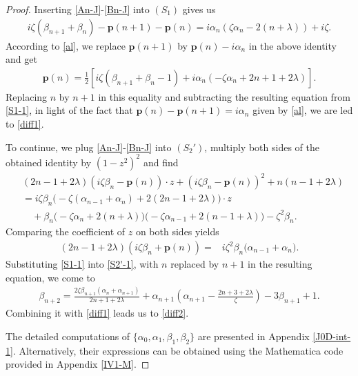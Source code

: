 \documentclass[11pt,a4paper]{article}
\numberwithin{equation}{section}
\begin{document}
\begin{proof}
Inserting \eqref{An-J}-\eqref{Bn-J} into $(S_1)$ gives us
\begin{align}\label{S1}
i\zeta\left(\beta_{n+1}+\beta_n\right)-\textbf{p}(n+1)-\textbf{p}(n)=i\alpha_n\left(\zeta\alpha_n-2(n+\lambda)\right)+i\zeta.
\end{align}
According to \eqref{al}, we replace $\textbf{p}(n+1)$ by $\textbf{p}(n)-i\alpha_n$ in the above identity and get
\begin{align}\label{S1-1}
\textbf{p}(n)=\frac{1}{2}\left[i\zeta(\beta_{n+1}+\beta_n-1)+i\alpha_n(-\zeta\alpha_n+2n+1+2\lambda)\right].
\end{align}
Replacing $n$ by $n+1$ in this equality and subtracting the resulting equation from \eqref{S1-1}, in light of the fact that $\textbf{p}(n)-\textbf{p}(n+1)=i\alpha_n$ given by \eqref{al}, we are led to \eqref{diff1}.

To continue, we plug \eqref{An-J}-\eqref{Bn-J} into $(S_2')$, multiply both sides of the obtained identity by $\left(1-z^2\right)^2$ and find
\begin{equation*}
\begin{aligned}
&(2n-1+2\lambda)\left(i\zeta\beta_n-\textbf{p}(n)\right)\cdot z+(i\zeta\beta_n-\textbf{p}(n))^2+n(n-1+2\lambda)\\
&=i\zeta\beta_n\big(-\zeta(\alpha_{n-1}+\alpha_n)+2(2n-1+2\lambda)\big)\cdot z\\
&\quad+\beta_n\big(-\zeta\alpha_n+2(n+\lambda)\big)\big(-\zeta\alpha_{n-1}+2(n-1+\lambda)\big)-\zeta^2\beta_n.
\end{aligned}
\end{equation*}
Comparing the coefficient of $z$ on both sides yields
\begin{align}
(2n-1+2\lambda)\left(i\zeta\beta_n+\textbf{p}(n)\right)=&i\zeta^2\beta_n\big(\alpha_{n-1}+\alpha_n\big).\label{S2'-1}
\end{align}
Substituting \eqref{S1-1} into \eqref{S2'-1}, with $n$ replaced by $n+1$ in the resulting equation, we come to
\begin{align*}
\beta_{n+2}=\frac{2\zeta\beta_{n+1}\left(\alpha_n+\alpha_{n+1}\right)}{2n+1+2\lambda}+\alpha_{n+1}\left(\alpha_{n+1}-\frac{2n+3+2\lambda}{\zeta}\right)-3\beta_{n+1}+1.
\end{align*}
Combining it with \eqref{diff1} leads us to \eqref{diff2}.

The detailed computations of $\{\alpha_0,\alpha_1,\beta_1,\beta_2\}$ are presented in Appendix \ref{J0D-int-1}. Alternatively, their expressions can be obtained using the Mathematica code provided in Appendix \ref{IV1-M}.
\end{proof}
\end{document}
